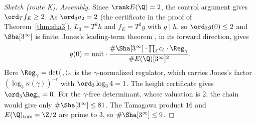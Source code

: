 \begin{proof}[Sketch (route K)]
\emph{Assembly.} Since $\rank E(\Q)=2$, the control argument gives $\ord_Tf_E\ge2$. As $\ord_3a_2=2$ (the certificate in the proof of Theorem~\ref{thm:sha3}), $L_3=T^2h$ and $f_E=T^2g$ with $g\mid h$, so $\ord_3g(0)\le2$ and $\Sha[3^\infty]$ is finite. Jones's leading-term theorem \cite[Thm.~3.1]{jones}, in its forward direction, gives
\[
g(0)=\text{unit}\cdot\frac{\#\Sha[3^\infty]\cdot\prod_\ell c_\ell\cdot\Reg_\gamma}{\#E(\Q)[3^\infty]^2}.
\]
Here $\Reg_\gamma=\det\langle\,,\rangle_\gamma$ is the $\gamma$-normalized regulator, which carries Jones's factor $(\log_3\kappa(\gamma))^{-r}$ with $\ord_3\log_34=1$. The height certificate gives $\ord_3\Reg_\gamma=0$. For the $\gamma$-free determinant, whose valuation is $2$, the chain would give only $\#\Sha[3^\infty]\le81$. The Tamagawa product $16$ and $E(\Q)_{\mathrm{tors}}=\Z/2$ are prime to $3$, so $\#\Sha[3^\infty]\le9$.
\end{proof}

